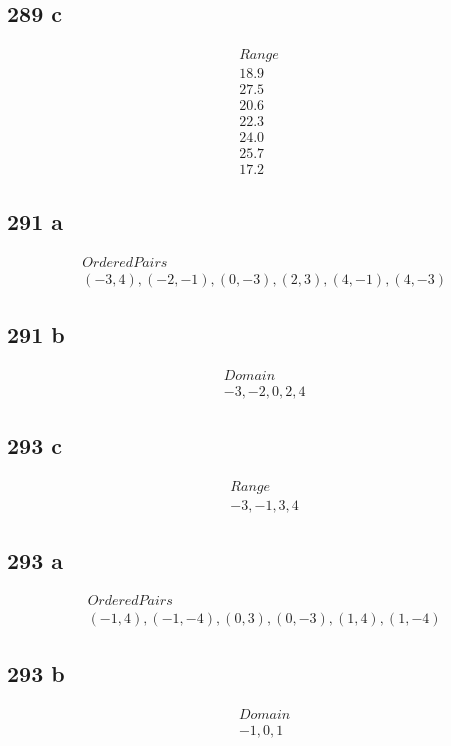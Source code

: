 \documentclass{article}
\begin{document}
    \subsection*{289 c}
    \begin{align*}
        Range \\
        18.9 \\
        27.5 \\
        20.6 \\
        22.3 \\
        24.0 \\
        25.7 \\
        17.2
    \end{align*}

    \subsection*{291 a}
    \begin{align*}
        &Ordered Pairs\\
        &(-3, 4), (-2, -1), (0, -3), (2, 3), (4, -1), (4, -3)
    \end{align*}

    \subsection*{291 b}
    \begin{align*}
        &Domain\\
        &{-3, -2, 0, 2, 4}
    \end{align*}

    \subsection*{293 c}
    \begin{align*}
        &Range\\
        &{-3, -1, 3, 4}
    \end{align*}

    \subsection*{293 a}
    \begin{align*}
        &Ordered Pairs\\
        &(-1, 4), (-1, -4), (0, 3), (0, -3), (1, 4), (1, -4)
    \end{align*}

    \subsection*{293 b}
    \begin{align*}
        &Domain\\
        &{-1, 0, 1}
    \end{align*}
\end{document}

